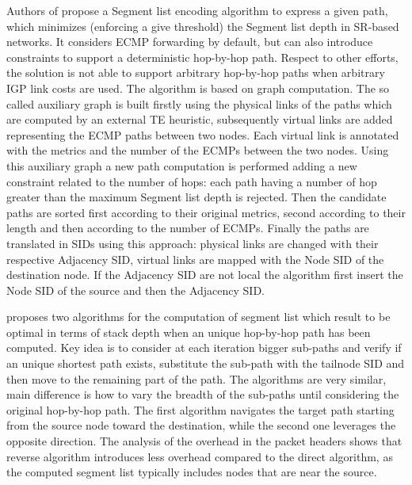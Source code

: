 Authors of \cite{efficientlabel} propose a Segment list encoding algorithm to express a given path, which minimizes (enforcing a give threshold) the Segment list depth in SR-based networks. It considers ECMP forwarding by default, but can also introduce constraints to support a deterministic hop-by-hop path. Respect to other efforts, the solution is not able to support arbitrary hop-by-hop paths when arbitrary IGP link costs are used. The algorithm is based on graph computation. The so called auxiliary graph is built firstly using the physical links of the paths which are computed by an external TE heuristic, subsequently virtual links are added representing the ECMP paths between two nodes. Each virtual link is annotated with the metrics and the number of the ECMPs between the two nodes. Using this auxiliary graph a new path computation is performed adding a new constraint related to the number of hops: each path having a number of hop greater than the maximum Segment list depth is rejected. Then the candidate paths are sorted first according to their original metrics, second according to their length and then according to the number of ECMPs. Finally the paths are translated in SIDs using this approach: physical links are changed with their respective Adjacency SID, virtual links are mapped with the Node SID of the destination node. If the Adjacency SID are not local the algorithm first insert the Node SID of the source and then the Adjacency SID. 

\cite{pathencoding} proposes two algorithms for the computation of segment list which result to be optimal in terms of stack depth when an unique hop-by-hop path has been computed. Key idea is to consider at each iteration bigger sub-paths and verify if an unique shortest path exists, substitute the sub-path with the tailnode SID and then move to the remaining part of the path. The algorithms are very similar, main difference is how to vary the breadth of the sub-paths until considering the original hop-by-hop path. The first algorithm navigates the target path starting from the source node toward the destination, while the second one leverages the opposite direction. The analysis of the overhead in the packet headers shows that reverse algorithm introduces less overhead compared to the direct algorithm, as the computed segment list typically includes nodes that are near the source. 

